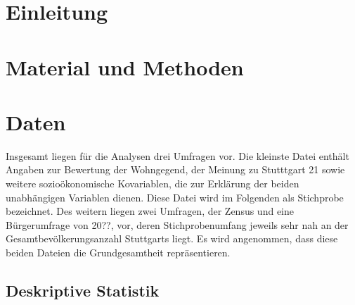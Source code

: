 \documentclass{Vorlage}
\begin{document}
\restoregeometry


\pagestyle{plain}

\tableofcontents %

\newpage %

\listoffigures %

\listoftables %

\newpage



\pagestyle{fancy}

\section{Einleitung}

\newpage

\section{Material und Methoden}
\section{Daten}
Insgesamt liegen für die Analysen drei Umfragen vor. Die kleinste Datei enthält Angaben zur Bewertung der Wohngegend, der Meinung zu Stutttgart 21 sowie weitere sozioökonomische Kovariablen, die zur Erklärung der beiden unabhängigen Variablen dienen. Diese Datei wird im Folgenden als Stichprobe bezeichnet. Des weitern liegen zwei Umfragen, der Zensus und eine Bürgerumfrage von 20??, vor, deren Stichprobenumfang jeweils sehr nah an der Gesamtbevölkerungsanzahl Stuttgarts liegt. Es wird angenommen, dass diese beiden Dateien die Grundgesamtheit repräsentieren.


\subsection{Deskriptive Statistik}
\end{document}
